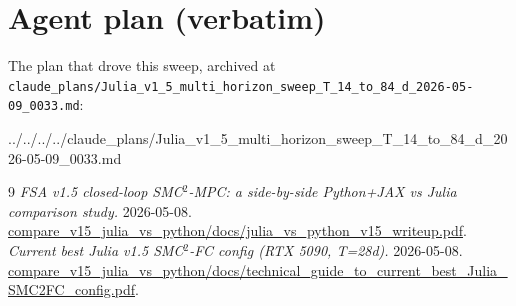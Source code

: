 \documentclass[11pt,a4paper]{article}
\begin{document}
\appendix
\section{Agent plan (verbatim)}
\label{app:plan}

The plan that drove this sweep, archived at
\texttt{claude\_plans/Julia\_v1\_5\_multi\_horizon\_sweep\_T\_14\_to\_84\_d\_2026-05-09\_0033.md}:


                {../../../../claude_plans/Julia_v1_5_multi_horizon_sweep_T_14_to_84_d_2026-05-09_0033.md}


\begin{thebibliography}{9}
  \emph{FSA v1.5 closed-loop SMC$^2$-MPC: a side-by-side Python+JAX vs
  Julia comparison study.} 2026-05-08.
  \url{compare_v15_julia_vs_python/docs/julia_vs_python_v15_writeup.pdf}.
  \emph{Current best Julia v1.5 SMC$^2$-FC config (RTX 5090, T=28d).}
  2026-05-08.
  \url{compare_v15_julia_vs_python/docs/technical_guide_to_current_best_Julia_SMC2FC_config.pdf}.
\end{thebibliography}
\end{document}
